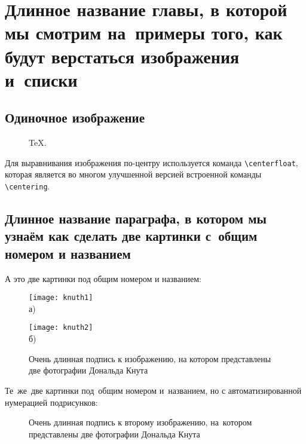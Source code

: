 \chapter{Длинное название главы, в которой мы смотрим на~примеры того, как будут верстаться изображения и~списки}\label{ch:ch2}

\section{Одиночное изображение}\label{sec:ch2/sec1}

\begin{figure}[ht]
  \caption{TeX.}\label{fig:latex}
\end{figure}

Для выравнивания изображения по-центру используется команда \verb+\centerfloat+, которая является во
многом улучшенной версией встроенной команды \verb+\centering+.

\section{Длинное название параграфа, в котором мы узнаём как сделать две картинки с~общим номером и названием}\label{sec:ch2/sect2}

А это две картинки под общим номером и названием:
\begin{figure}[ht]
  \begin{minipage}[b][][b]{0.49\linewidth}\centering
    \texttt{[image: knuth1]} \\ а)
  \end{minipage}
  \hfill
  \begin{minipage}[b][][b]{0.49\linewidth}\centering
    \texttt{[image: knuth2]} \\ б)
  \end{minipage}
  \caption{Очень длинная подпись к изображению,
      на котором представлены две фотографии Дональда Кнута}
  \label{fig:knuth}
\end{figure}

Те~же~две картинки под~общим номером и~названием,
но с автоматизированной нумерацией подрисунков:
\begin{figure}[ht]
    \caption[Этот текст попадает в названия рисунков в списке рисунков]{Очень
    длинная подпись к второму изображению, на~котором представлены две
    фотографии Дональда Кнута}\label{fig:knuth_2}
\end{figure}

